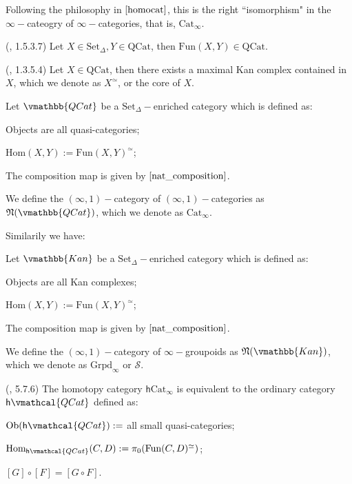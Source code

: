 Following the philosophy in $\ref{homocat}$, this is the right ``isomorphism" in the $\infty-$cateogry of $\infty-$categories, that is, $\text{Cat}_\infty$.

\begin{lemma}(\textcite{ker}, 1.5.3.7)
    Let $X\in \text{Set}_\Delta,Y\in \text{QCat}$, then $\text{Fun}(X,Y)\in \text{QCat}$. 
\end{lemma}

\begin{lemma}(\textcite{ker}, 1.3.5.4)
    Let $X\in \text{QCat}$, then there exists a maximal Kan complex contained in $X$, which we denote as $X^\simeq$, or the core of $X$.
\end{lemma}

\begin{definition}
    Let $\vmathbb{QCat}$ be a $\text{Set}_\Delta-$enriched category which is defined as:
    
    Objects are all quasi-categories;

    $\text{Hom}(X,Y):=\text{Fun}(X,Y)^\simeq$;

    The composition map is given by $\ref{nat_composition}$.
\end{definition}

\begin{definition}
    We define the $(\infty,1)-$category of $(\infty,1)-$categories as $\mathfrak{N}(\vmathbb{QCat})$, which we denote as $\text{Cat}_\infty$.
\end{definition}

Similarily we have:

\begin{definition}
     Let $\vmathbb{Kan}$ be a $\text{Set}_\Delta-$enriched category which is defined as:
    
    Objects are all Kan complexes;

    $\text{Hom}(X,Y):=\text{Fun}(X,Y)^\simeq$;

    The composition map is given by $\ref{nat_composition}$.   
\end{definition}

\begin{definition}
    We define the $(\infty,1)-$category of $\infty-$groupoids as $\mathfrak{N}(\vmathbb{Kan})$, which we denote as $\text{Grpd}_\infty$ or $\mathscr{S}$.
\end{definition}

\begin{proposition}(\textcite{lc}, 5.7.6)
    The homotopy category $\textsf{h}\text{Cat}_\infty$ is equivalent to the ordinary category $\textsf{h}\vmathcal{QCat}$ defined as:

    $\text{Ob}(\textsf{h}\vmathcal{QCat}):= $ all small quasi-categories;

    $\text{Hom}_{\textsf{h}\vmathcal{QCat}}(C,D):=\pi_0(\text{Fun}(C,D)^\simeq)$;

    $[G]\circ[F]=[G\circ F]$.
\end{proposition}

